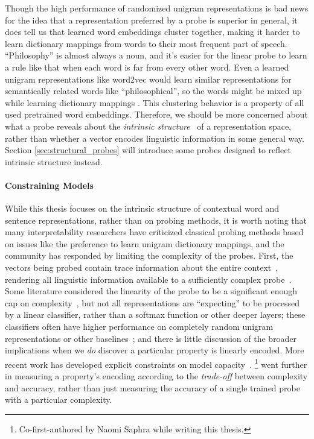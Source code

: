 Though the high performance of randomized unigram representations is bad news for the idea that a representation preferred by a probe is superior in general, it does tell us that learned word embeddings cluster together, making it harder to learn dictionary mappings from words to their most frequent part of speech. ``Philosophy'' is almost always a noun, and it's easier for the linear probe to learn a rule like that when each word is far from every other word. Even a learned unigram representations like word2vec \cite{mikolov_distributed_2013} would learn similar representations for semantically related words like ``philosophical'', so the words might be mixed up while learning dictionary mappings \citep{pimentel_pareto_2020}. This clustering behavior is a property of all used pretrained word embeddings. Therefore, we should be more concerned about what a probe reveals about the \textit{intrinsic structure}~\citep{hennigen_intrinsic_2020} of a representation space, rather than whether a vector encodes linguistic information in some general way. Section \ref{sec:structural_probes} will introduce some probes designed to reflect intrinsic structure instead.

\paragraph*{Constraining Models} While this thesis focuses on the intrinsic structure of contextual word and sentence representations, rather than on probing methods, it is worth noting that many interpretability researchers have criticized classical probing methods based on issues like the preference to learn unigram dictionary mappings, and the community has responded by limiting the complexity of the probes. First, the vectors being probed contain trace information about the entire context~\citep{conneau_what_2018}, rendering all linguistic information available to a sufficiently complex probe~\citep{pimentel_information-theoretic_2020}. Some literature considered the linearity of the probe to be a significant enough cap on complexity~\citep{liu_linguistic_2019,alain_understanding_2018}, but not all representations are ``expecting'' to be processed by a linear classifier, rather than a softmax function or other deeper layers; these classifiers often have higher performance on completely random unigram representations or other baselines~\citep{hewitt_designing_2019}; and there is little discussion of the broader implications when we \textit{do} discover a particular property is linearly encoded. More recent work has developed explicit constraints on model capacity~\citep{maudslay_tale_2020,hewitt_designing_2019}. \citet{pimentel_pareto_2020}\footnote{Co-first-authored by Naomi Saphra while writing this thesis.} went further in measuring a property's encoding according to the \textit{trade-off} between complexity and accuracy, rather than just measuring the accuracy of a single trained probe with a particular complexity. 

